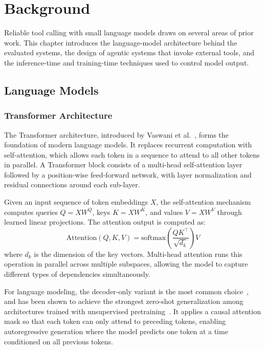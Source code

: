 \chapter{Background} \label{ch:background}

Reliable tool calling with small language models draws on several areas of prior work. This chapter introduces the language-model architecture behind the evaluated systems, the design of agentic systems that invoke external tools, and the inference-time and training-time techniques used to control model output.

\section{Language Models}

\subsection{Transformer Architecture}

The Transformer architecture, introduced by Vaswani et al.~\cite{vaswani2017attention}, forms the foundation of modern language models. It replaces recurrent computation with self-attention, which allows each token in a sequence to attend to all other tokens in parallel. A Transformer block consists of a multi-head self-attention layer followed by a position-wise feed-forward network, with layer normalization and residual connections around each sub-layer.

Given an input sequence of token embeddings $X$, the self-attention mechanism computes queries $Q = XW^Q$, keys $K = XW^K$, and values $V = XW^V$ through learned linear projections. The attention output is computed as:
\begin{equation}
\text{Attention}(Q, K, V) = \text{softmax}\!\left(\frac{QK^\top}{\sqrt{d_k}}\right)V
\end{equation}
where $d_k$ is the dimension of the key vectors. Multi-head attention runs this operation in parallel across multiple subspaces, allowing the model to capture different types of dependencies simultaneously.

For language modeling, the decoder-only variant is the most common
choice~\cite{brown2020language}, and has been shown to achieve the strongest
zero-shot generalization among architectures trained with unsupervised
pretraining~\cite{wang2022language}. It
applies a causal attention mask so that each token can only attend to
preceding tokens, enabling autoregressive generation where the model
predicts one token at a time conditioned on all previous tokens.

